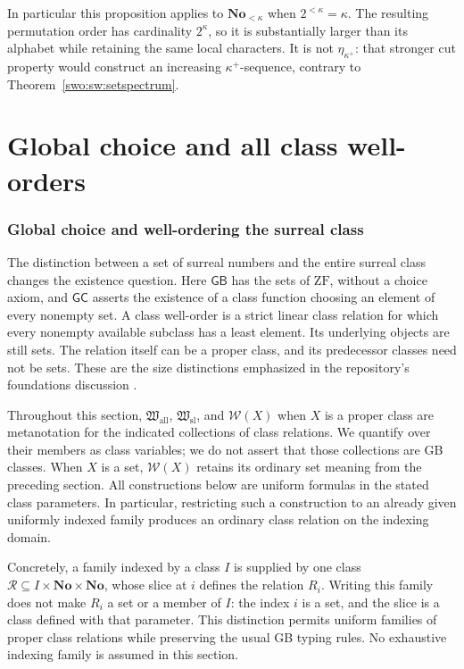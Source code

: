 \documentclass[11pt]{article}
\theoremstyle{definition}
\theoremstyle{remark}
\newcommand{\No}{\mathbf{No}}
\newcommand{\WO}{\mathcal W}
\newcommand{\Hsl}{\mathfrak W_{\mathrm{sl}}}
\newcommand{\Hall}{\mathfrak W_{\mathrm{all}}}
\newcommand{\GB}{\mathsf{GB}}
\newcommand{\GC}{\mathsf{GC}}
\begin{document}
In particular this proposition applies to \(\No_{<\kappa}\)
when \(2^{<\kappa}=\kappa\).
The resulting permutation order has cardinality \(2^\kappa\),
so it is substantially larger than its alphabet while retaining
the same local characters.  It is not
\(\eta_{\kappa^+}\): that stronger cut property would construct
an increasing \(\kappa^+\)-sequence, contrary to
Theorem~\ref{swo:sw:setspectrum}.

\part{Global choice and all class well-orders}\label{swo:part:classes}


\section{Global choice and well-ordering the surreal class}
\label{swo:cf:existence}

The distinction between a set of surreal numbers and the entire surreal class
changes the existence question.  Here \(\GB\) has the sets of \(\mathrm{ZF}\),
without a choice axiom, and \(\GC\) asserts the existence of a class function
choosing an element of every nonempty set.  A class well-order is a strict
linear class relation for which every nonempty available subclass has a least
element.  Its underlying objects are still sets.  The relation itself can be
a proper class, and its predecessor classes need not be sets.  These are the
size distinctions emphasized in the repository's foundations discussion
\cite{ProveItFoundations}.

Throughout this section, \(\Hall\), \(\Hsl\), and \(\WO(X)\) when
\(X\) is a proper class are metanotation for the indicated collections
of class relations.  We quantify over their members as class variables;
we do not assert that those collections are GB classes.  When \(X\) is
a set, \(\WO(X)\) retains its ordinary set meaning from the preceding
section.  All constructions below are uniform formulas in the stated class
parameters.  In particular, restricting such a construction to an already
given uniformly indexed family produces an ordinary class relation on the
indexing domain.

Concretely, a family indexed by a class \(I\) is supplied by one class
\(\mathcal R\subseteq I\times\No\times\No\), whose slice at \(i\)
defines the relation \(R_i\).  Writing this family does not make \(R_i\)
a set or a member of \(I\): the index \(i\) is a set, and the slice is
a class defined with that parameter.  This distinction permits uniform
families of proper class relations while preserving the usual GB typing
rules.  No exhaustive indexing family is assumed in this section.
\end{document}
